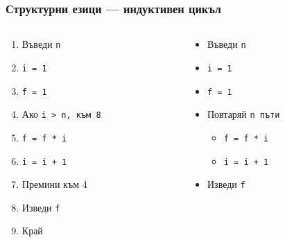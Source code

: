 \documentclass{beamer}
\begin{document}
\begin{frame}
  \frametitle{Структурни езици — индуктивен цикъл}

  \begin{columns}
    \begin{column}{.5\textwidth}
      \begin{enumerate}
      \item Въведи \tt n
      \item \tt{i = 1}
      \item \tt{f = 1}
      \item Ако \tt{i > n}, към 8
      \item \tt{f = f * i}
      \item \tt{i = i + 1}
      \item Премини към 4
      \item Изведи \tt f
      \item Край
      \end{enumerate}
    \end{column}
    \begin{column}{.5\textwidth}
      \begin{itemize}
      \item Въведи \tt n
      \item \tt{i = 1}
      \item \tt{f = 1}
      \item Повтаряй \tt n пъти
        \begin{itemize}
        \item \tt{f = f * i}
        \item \tt{i = i + 1}
        \end{itemize}
      \item Изведи \tt f
      \end{itemize}
    \end{column}
  \end{columns}
\end{frame}
\end{document}
